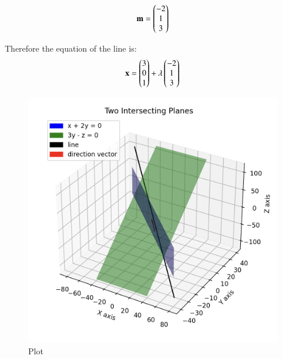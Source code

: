 \documentclass[12pt]{article}
\begin{document}
\begin{align}
\mathbf{m}= \begin{pmatrix}-2\\1\\3\end{pmatrix}
\end{align}

Therefore the equation of the line is:
\begin{align}
\mathbf{x} = \begin{pmatrix}3\\0\\1\end{pmatrix} + \lambda\begin{pmatrix}-2\\1\\3\end{pmatrix}
\end{align}

\begin{figure}[H]
    \centering
    \includegraphics[width=0.9\columnwidth]{Figs/Plot7.png}
    \caption{Plot}
    \label{fig:placeholder}
\end{figure}
\end{document}
